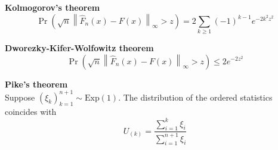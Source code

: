 \documentclass[a4paper]{article}
\newcommand{\brac}[1]{{\left ( #1 \right )}}
\newcommand{\nrm}[1]{{\left\| #1 \right \|}}
\begin{document}
\noindent\textbf{Kolmogorov's theorem}\hfill\\
\[\Pr\brac{\sqrt{n}\nrm{\hat{F}_n(x) - F(x)}_\infty>z} = 2\sum_{k\geq1} {(-1)}^{k-1} e^{-2k^2z^2}\]

\noindent\textbf{Dworezky-Kifer-Wolfowitz theorem}\hfill\\
\[\Pr\brac{\sqrt{n}\nrm{\hat{F}_n(x) - F(x)}_\infty>z} \leq 2 e^{-2z^2}\]

\noindent\textbf{Pike's theorem}\hfill\\
Suppose $\brac{\xi_k}_{k=1}^{n+1}\sim \text{Exp}(1)$.
The distribution of the ordered statistics coincides with 
\[U_{(k)} = \frac{\sum_{i=1}^k\xi_i}{\sum_{i=1}^{n+1}\xi_i}\]


\end{document}
